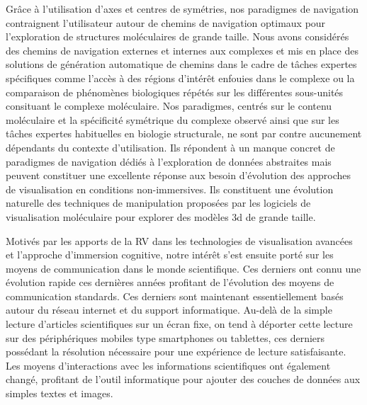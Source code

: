 Grâce à l'utilisation d'axes et centres de symétries, nos paradigmes de navigation contraignent l'utilisateur autour de chemins de navigation optimaux pour l'exploration de structures moléculaires de grande taille. Nous avons considérés des chemins de navigation externes et internes aux complexes et mis en place des solutions de génération automatique de chemins dans le cadre de tâches expertes spécifiques comme l'accès à des régions d'intérêt enfouies dans le complexe ou la comparaison de phénomènes biologiques répétés sur les différentes sous-unités consituant le complexe moléculaire.
Nos paradigmes, centrés sur le contenu moléculaire et la spécificité symétrique du complexe observé ainsi que sur les tâches expertes habituelles en biologie structurale, ne sont par contre aucunement dépendants du contexte d'utilisation. Ils répondent à un manque concret de paradigmes de navigation dédiés à l'exploration de données abstraites mais peuvent constituer une excellente réponse aux besoin d'évolution des approches de visualisation en conditions non-immersives. Ils constituent une évolution naturelle des techniques de manipulation proposées par les logiciels de visualisation moléculaire pour explorer des modèles 3d de grande taille.




Motivés par les apports de la RV dans les technologies de visualisation avancées et l'approche d'immersion cognitive, notre intérêt s'est ensuite porté sur les moyens de communication dans le monde scientifique. Ces derniers ont connu une évolution rapide ces dernières années profitant de l'évolution des moyens de communication standards. Ces derniers sont maintenant essentiellement basés autour du réseau internet et du support informatique. Au-delà de la simple lecture d'articles scientifiques sur un écran fixe, on tend à déporter cette lecture sur des périphériques mobiles type smartphones ou tablettes, ces derniers possédant la résolution nécessaire pour une expérience de lecture satisfaisante. Les moyens d'interactions avec les informations scientifiques ont également changé, profitant de l'outil informatique pour ajouter des couches de données aux simples textes et images.

